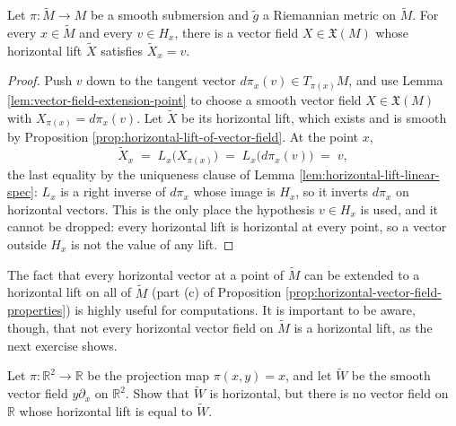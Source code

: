 \begin{proposition}
\label{prop:horizontal-lift-realizes-horizontal-vector}
\leanok
{}
Let $\pi : \tilde{M} \to M$ be a smooth submersion and $\tilde{g}$ a Riemannian metric on $\tilde{M}$. For every $x \in \tilde{M}$ and every $v \in H_x$, there is a vector field $X \in \mathfrak{X}(M)$ whose horizontal lift $\tilde{X}$ satisfies $\tilde{X}_x = v$.
\end{proposition}

\begin{proof}
\leanok
Push $v$ down to the tangent vector $d\pi_x(v) \in T_{\pi(x)}M$, and use Lemma \ref{lem:vector-field-extension-point} to choose a smooth vector field $X \in \mathfrak{X}(M)$ with $X_{\pi(x)} = d\pi_x(v)$. Let $\tilde{X}$ be its horizontal lift, which exists and is smooth by Proposition \ref{prop:horizontal-lift-of-vector-field}. At the point $x$,
\[
\tilde{X}_x \;=\; L_x\bigl(X_{\pi(x)}\bigr) \;=\; L_x\bigl(d\pi_x(v)\bigr) \;=\; v,
\]
the last equality by the uniqueness clause of Lemma \ref{lem:horizontal-lift-linear-spec}: $L_x$ is a right inverse of $d\pi_x$ whose image is $H_x$, so it inverts $d\pi_x$ on horizontal vectors. This is the only place the hypothesis $v \in H_x$ is used, and it cannot be dropped: every horizontal lift is horizontal at every point, so a vector outside $H_x$ is not the value of any lift.
\end{proof}

The fact that every horizontal vector at a point of $\tilde{M}$ can be extended to a horizontal lift on all of $\tilde{M}$ (part (c) of Proposition \ref{prop:horizontal-vector-field-properties}) is highly useful for computations. It is important to be aware, though, that not every horizontal vector field on $\tilde{M}$ is a horizontal lift, as the next exercise shows.

\begin{exercise}
\label{exer:horizontal-vector-field-not-lift}
Let $\pi: \mathbb{R}^2 \to \mathbb{R}$ be the projection map $\pi(x,y) = x$, and let $\tilde{W}$ be the smooth vector field $y\partial_x$ on $\mathbb{R}^2$. Show that $\tilde{W}$ is horizontal, but there is no vector field on $\mathbb{R}$ whose horizontal lift is equal to $\tilde{W}$.
\end{exercise}

